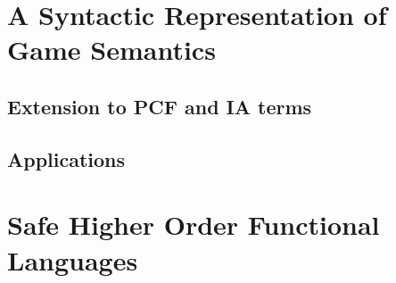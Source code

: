 \chapter{A Syntactic Representation of Game Semantics}
        
          
           

    \section{Extension to PCF and IA terms}
    \section{Applications}



\chapter{Safe Higher Order Functional Languages}

    


